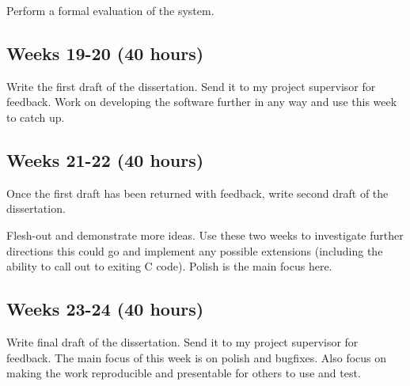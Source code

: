 \documentclass[11pt]{article}
\begin{document}
Perform a formal evaluation of the system.

\subsection{Weeks 19-20 (40 hours)}

Write the first draft of the dissertation. Send it to my project supervisor for
feedback. Work on developing the software further in any way and use this week
to catch up.

\subsection{Weeks 21-22 (40 hours)}

Once the first draft has been returned with feedback, write second draft of the
dissertation.

Flesh-out and demonstrate more ideas. Use these two weeks to investigate
further directions this could go and implement any possible extensions
(including the ability to call out to exiting C code). Polish is the main focus
here.

\subsection{Weeks 23-24 (40 hours)}

Write final draft of the dissertation. Send it to my project supervisor for
feedback. The main focus of this week is on polish and bugfixes. Also focus on
making the work reproducible and presentable for others to use and test.


\end{document}
